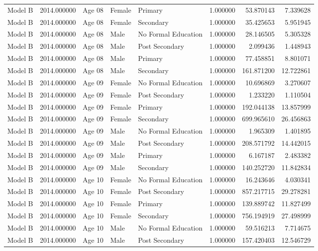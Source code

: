 \begin{table}[ht]
\begin{tabular}{lrlllrrr}
Model B & 2014.000000 & Age 08 & Female & Primary & 1.000000 & 53.870143 & 7.339628 \\
Model B & 2014.000000 & Age 08 & Female & Secondary & 1.000000 & 35.425653 & 5.951945 \\
Model B & 2014.000000 & Age 08 & Male & No Formal Education & 1.000000 & 28.146505 & 5.305328 \\
Model B & 2014.000000 & Age 08 & Male & Post Secondary & 1.000000 & 2.099436 & 1.448943 \\
Model B & 2014.000000 & Age 08 & Male & Primary & 1.000000 & 77.458851 & 8.801071 \\
Model B & 2014.000000 & Age 08 & Male & Secondary & 1.000000 & 161.871200 & 12.722861 \\
Model B & 2014.000000 & Age 09 & Female & No Formal Education & 1.000000 & 10.696869 & 3.270607 \\
Model B & 2014.000000 & Age 09 & Female & Post Secondary & 1.000000 & 1.233220 & 1.110504 \\
Model B & 2014.000000 & Age 09 & Female & Primary & 1.000000 & 192.044138 & 13.857999 \\
Model B & 2014.000000 & Age 09 & Female & Secondary & 1.000000 & 699.965610 & 26.456863 \\
Model B & 2014.000000 & Age 09 & Male & No Formal Education & 1.000000 & 1.965309 & 1.401895 \\
Model B & 2014.000000 & Age 09 & Male & Post Secondary & 1.000000 & 208.571792 & 14.442015 \\
Model B & 2014.000000 & Age 09 & Male & Primary & 1.000000 & 6.167187 & 2.483382 \\
Model B & 2014.000000 & Age 09 & Male & Secondary & 1.000000 & 140.252720 & 11.842834 \\
Model B & 2014.000000 & Age 10 & Female & No Formal Education & 1.000000 & 16.243646 & 4.030341 \\
Model B & 2014.000000 & Age 10 & Female & Post Secondary & 1.000000 & 857.217715 & 29.278281 \\
Model B & 2014.000000 & Age 10 & Female & Primary & 1.000000 & 139.889742 & 11.827499 \\
Model B & 2014.000000 & Age 10 & Female & Secondary & 1.000000 & 756.194919 & 27.498999 \\
Model B & 2014.000000 & Age 10 & Male & No Formal Education & 1.000000 & 59.516213 & 7.714675 \\
Model B & 2014.000000 & Age 10 & Male & Post Secondary & 1.000000 & 157.420403 & 12.546729 \\

\end{tabular}
\end{table}
